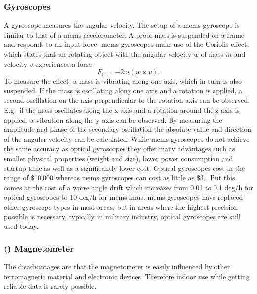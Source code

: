 \subsubsection{ Gyroscopes}
A gyroscope measures the angular velocity.
The setup of a \gls{mems} gyroscope is similar to that of a \gls{mems} accelerometer.
A proof mass is suspended on a frame and responds to an input force.
\gls{mems} gyroscopes make use of the Coriolis effect, which states that an rotating object with the angular velocity $w$ of mass $m$ and velocity $v$ experiences a force
\[ F_C = -2m(w\times v). \]
To measure the effect, a mass is vibrating along one axis, which in turn is also suspended.
If the mass is oscillating along one axis and a rotation is applied, a second oscillation on the axis perpendicular to the rotation axis can be observed.
E.g.\ if the mass oscillates along the x-axis and a rotation around the z-axis is applied, a vibration along the y-axis can be observed.
By measuring the amplitude and phase of the secondary oscillation the absolute value and direction of the angular velocity can be calculated.
While \gls{mems} gyroscopes do not achieve the same accuracy as optical gyroscopes they offer many advantages such as smaller physical properties (weight and size), lower power consumption and startup time as well as a significantly lower cost.
Optical gyroscopes cost in the range of \$10,000 whereas \gls{mems} gyroscopes can cost as little as \$3 \cite{Perlmutter2016}.
But this comes at the cost of a worse angle drift which increases from 0.01 to 0.1 deg/h for optical gyroscopes to 10 deg/h  for \gls{mems}-\gls{imu}s.
\gls{mems} gyroscopes have replaced other gyroscope types in most areas, but in areas where the highest precision possible is necessary, typically in military industry, optical gyroscopes are still used today.

\subsubsection{() Magnetometer}
The disadvantages are that the magnetometer is easily influenced by other ferromagnetic material and electronic devices.
Therefore indoor use while getting reliable data is rarely possible.

